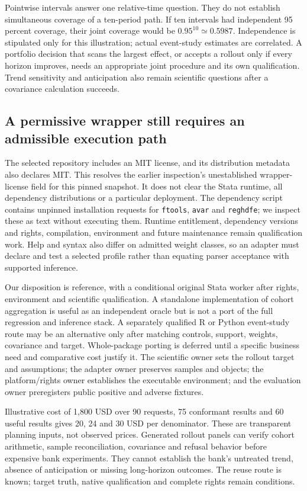 Pointwise intervals answer one relative-time question. They do not establish
simultaneous coverage of a ten-period path. If ten intervals had independent
95 percent coverage, their joint coverage would be $0.95^{10}\simeq0.5987$.
Independence is stipulated only for this illustration; actual event-study
estimates are correlated. A portfolio decision that scans the largest effect,
or accepts a rollout only if every horizon improves, needs an appropriate
joint procedure and its own qualification. Trend sensitivity and anticipation
also remain scientific questions after a covariance calculation succeeds.
\citep{exec24_eventstudy_original,exec24_eventstudy_contract}

\subsection{A permissive wrapper still requires an admissible execution path}
The selected repository includes an MIT license, and its distribution metadata
also declares MIT. This resolves the earlier inspection's unestablished
wrapper-license field for this pinned snapshot. It does not clear the Stata
runtime, all dependency distributions or a particular deployment. The dependency
script contains unpinned installation requests for \texttt{ftools}, \texttt{avar}
and \texttt{reghdfe}; we inspect these as text without executing them. Runtime
entitlement, dependency versions and rights, compilation, environment and future
maintenance remain qualification work. Help and syntax also differ on admitted
weight classes, so an adapter must declare and test a selected profile rather
than equating parser acceptance with supported inference.
\citep{exec24_eventstudy_sources}

Our disposition is reference, with a conditional original Stata worker after
rights, environment and scientific qualification. A standalone implementation
of cohort aggregation is useful as an independent oracle but is not a port of
the full regression and inference stack. A separately qualified R or Python
event-study route may be an alternative only after matching controls, support,
weights, covariance and target. Whole-package porting is deferred until a
specific business need and comparative cost justify it. The scientific owner
sets the rollout target and assumptions; the adapter owner preserves samples
and objects; the platform/rights owner establishes the executable environment;
and the evaluation owner preregisters public positive and adverse fixtures.
\citep{exec24_eventstudy_contract}

Illustrative cost of 1,800 USD over 90 requests, 75 conformant results and 60
useful results gives 20, 24 and 30 USD per denominator. These are transparent
planning inputs, not observed prices. Generated rollout panels can verify
cohort arithmetic, sample reconciliation, covariance and refusal behavior before
expensive bank experiments. They cannot establish the bank's untreated trend,
absence of anticipation or missing long-horizon outcomes. The reuse route is
known; target truth, native qualification and complete rights remain conditions.
\citep{exec24_eventstudy_contract}
